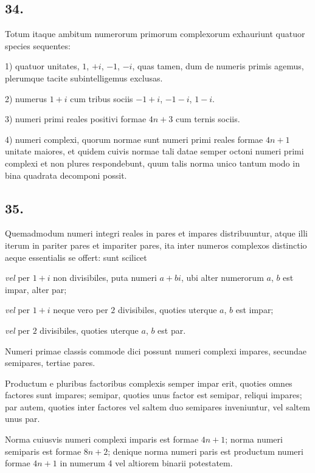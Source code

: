 \documentclass[twoside,12pt, showframe]{memoir}
\begin{document}
\subsection*{34.}
 
Totum itaque ambitum numerorum primorum complexorum exhauriunt quatuor species sequentes:
 
1) quatuor unitates, \(1\), \(+i\), \(-1\), \(-i\), quas tamen, dum de numeris primis agemus, plerumque tacite subintelligemus exclusas.
 
2) numerus \(1+i\) cum tribus sociis \(-1+i\), \(-1-i\), \(1-i\).
 
3) numeri primi reales positivi formae \(4 n+3\) cum ternis sociis.
 
4) numeri complexi, quorum normae sunt numeri primi reales formae \(4 n+1\) unitate maiores, et quidem cuivis normae tali datae semper octoni numeri primi complexi et non plures respondebunt, quum talis norma unico tantum modo in bina quadrata decomponi possit.

\subsection*{35.}
 
Quemadmodum numeri integri reales in pares et impares distribuuntur, atque illi iterum in pariter pares et impariter pares, ita inter numeros complexos distinctio aeque essentialis se offert: sunt scilicet
 
\textit{vel} per \(1+i\) non divisibiles, puta numeri \(a+b i\), ubi alter numerorum \(a\), \(b\) est impar, alter par;
 
\textit{vel} per \(1+i\) neque vero per \(2\) divisibiles, quoties uterque \(a\), \(b\) est impar;
 
\textit{vel} per \(2\) divisibiles, quoties uterque \(a\), \(b\) est par.
 
Numeri primae classis commode dici possunt numeri complexi impares, secundae semipares, tertiae pares.
 
Productum e pluribus factoribus complexis semper impar erit, quoties omnes factores sunt impares; semipar, quoties unus factor est semipar, reliqui impares; par autem, quoties inter factores vel saltem duo semipares inveniuntur, vel saltem unus par.
 
Norma cuiusvis numeri complexi imparis est formae \(4 n+1\); norma numeri semiparis est formae \(8 n+2\); denique norma numeri paris est productum numeri formae \(4 n+1\) in numerum 4 vel altiorem binarii potestatem.
\end{document}
